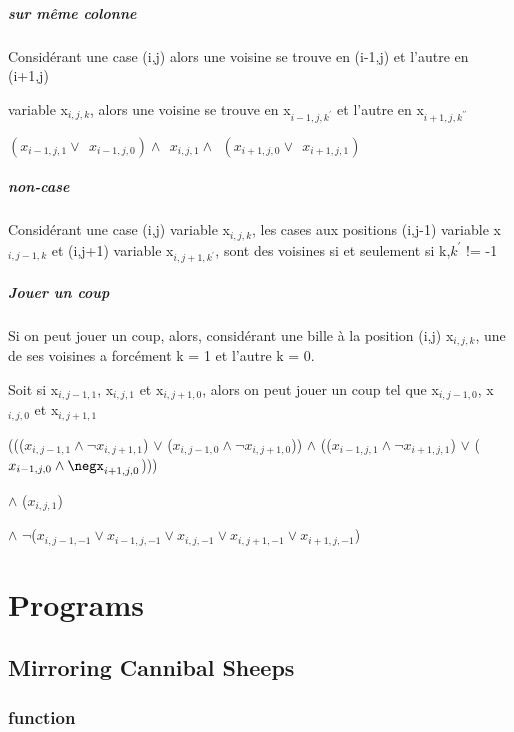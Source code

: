 \documentclass[utf8]{article}
\begin{document}
\subparagraph{sur même colonne}
Considérant une case (i,j)
alors une voisine se trouve en (i-1,j)
et l'autre en (i+1,j)

variable x$_{i,j,k}$,
alors une voisine se trouve en x$_{i-1,j,k^\prime}$ et l'autre en x$_{i+1,j,k^{\prime\prime}}$

$(x_{i-1,j,1} \lor ~~ x_{i-1,j,0} )
\land ~~
x_{i,j,1}
\land ~~
(x_{i+1,j,0} \lor ~~ x_{i+1,j,1})$

\subparagraph{non-case}
Considérant une case (i,j)
variable
x$_{i,j,k}$,
les cases aux positions
(i,j-1) variable x$_{i,j-1,k}$
et (i,j+1) variable x$_{i,j+1,k^\prime}$,
sont des voisines
si et seulement si k,$k^ {\prime}$ != -1

\subparagraph{Jouer un coup}
Si on peut jouer un coup, alors,
considérant une bille à la position (i,j) x$_{i,j,k}$,
une de ses voisines
a forcément k = 1 et l'autre k = 0.\newline

Soit si x$_{i,j-1,1}$, x$_{i,j,1}$ et x$_{i,j+1,0}$, alors on peut jouer un coup tel que x$_{i,j-1,0}$, x$_{i,j,0}$ et x$_{i,j+1,1}$
\newline

\begin{clips-code}
    ((($x_{i,j-1,1} \land \neg x_{i,j+1,1}$) $\lor$ ($ x_{i,j-1,0} \land \neg x_{i,j+1,0}$)) $\land$ (($x_{i-1,j,1} \land \neg x_{i+1,j,1}$) $\lor$ ($ x_{i-1,j,0} \land \negx_{i+1,j,0}$)))

    $\land$ ($x_{i,j,1}$)

    $\land$ $\neg$($ x_{i,j-1,-1} \lor x_{i-1,j,-1} \lor x_{i,j,-1} \lor x_{i,j+1,-1} \lor x_{i+1,j,-1}$)


\end{clips-code}

\newpage

\section{Programs}

\subsection{ Mirroring Cannibal Sheeps }

\subsubsection{function}
\end{document}
